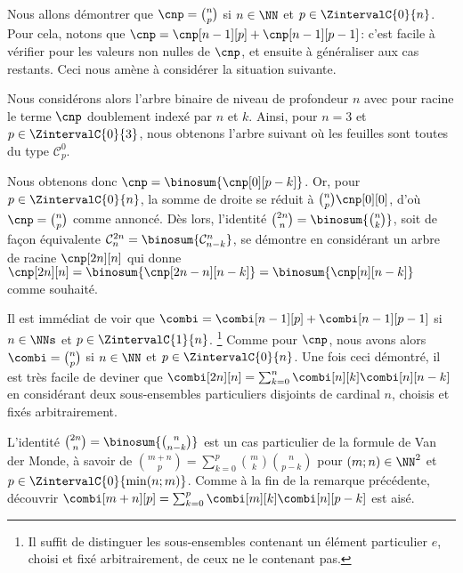 Nous allons démontrer que $\cnp = \binom{n}{p}$ si $n \in \NN$ et $p \in \ZintervalC{0}{n}$.
%
Pour cela, notons que $\cnp = \cnp[n-1][p] + \cnp[n-1][p-1]$:
c'est facile à vérifier pour les valeurs non nulles de $\cnp$, et ensuite à généraliser aux cas restants.
Ceci nous amène à considérer la situation suivante.

\explaintree{\cnp}{\cnp[n-1][p]}{\cnp[n-1][p-1]}%
            {\factobinomintertree}{}

Nous considérons alors l'arbre binaire de niveau de profondeur $n$ avec pour racine le terme $\cnp$ doublement indexé par $n$ et $k$.
Ainsi, pour $n=3$ et $p \in \ZintervalC{0}{3}$, nous obtenons l'arbre suivant où les feuilles sont toutes du type $\mathcal{C}^0_p$.


Nous obtenons donc
$\cnp = \binosum{\cnp[0][p-k]}$.
Or, pour $p \in \ZintervalC{0}{n}$, la somme de droite se réduit à $\binom{n}{p} \cnp[0][0]$, d'où $\cnp = \binom{n}{p}$ comme annoncé.
%
Dès lors, l'identité
$\binom{2n}{n} = \binosum{\binom{n}{k}}$,
soit de façon équivalente
$\mathcal{C}^{2n}_n = \binosum{\mathcal{C}^n_{n-k}}$,
se démontre en considérant un arbre de racine $\cnp[2n][n]$ qui donne
$\cnp[2n][n] = \binosum{\cnp[2n - n][n-k]} = \binosum{\cnp[n][n-k]}$
comme souhaité.


\begin{remark}
	Il est immédiat de voir que
	$\combi = \combi[n-1][p] + \combi[n-1][p-1]$ si $n \in \NNs$ et $p \in \ZintervalC{1}{n}$.%
	\footnote{
		Il suffit de distinguer les sous-ensembles contenant un élément particulier $e$, choisi et fixé arbitrairement, de ceux ne le contenant pas.
	}
	Comme pour $\cnp$, nous avons alors $\combi = \binom{n}{p}$ si $n \in \NN$ et $p \in \ZintervalC{0}{n}$.
	Une fois ceci démontré, il est très facile de deviner que 
	$\combi[2n][n] = \sum_{k=0}^{n} \combi[n][k] \combi[n][n-k]$
	en considérant deux sous-ensembles particuliers disjoints de cardinal $n$, choisis et fixés arbitrairement.
\end{remark}


\begin{remark}
	L'identité 
	$\binom{2n}{n} = \binosum{\binom{n}{n-k}}$
	est un cas particulier de la formule de Van der Monde, à savoir de
	$\binom{m + n}{p} = \sum_{k=0}^p \binom{m}{k} \binom{n}{p-k}$
	pour $(m ; n) \in \NN^2$ et $p \in \ZintervalC{0}{\min(n ; m)}$.
	Comme à la fin de la remarque précédente, découvrir
	$\combi[m + n][p] = \sum_{k=0}^p \combi[m][k] \combi[n][p-k]$
	est aisé. 
\end{remark}




